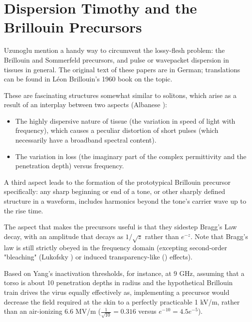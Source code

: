 \documentclass[paper.tex]{subfiles}
\begin{document}
\section{Dispersion Timothy and the Brillouin Precursors}

Uzunoglu \cite{Theoretical2020} mention a handy way to circumvent the lossy-flesh problem: the Brillouin and Sommerfeld precursors\footnotemark, and pulse or wavepacket dispersion in tissues in general. The original text of these papers are in German; translations can be found in Léon Brillouin's 1960 book\cite{Wave1960} on the topic.




These are fascinating structures somewhat similar to solitons, which arise as a result of an interplay between two aspects (Albanese 
\cite{Shortrisetime1989}): 

\begin{itemize}
	\item The highly dispersive nature of tissue (the variation in speed of light with frequency), which causes a peculiar distortion of short pulses (which necessarily have a broadband spectral content).
	\item The variation in loss (the imaginary part of the complex permittivity and the penetration depth) versus frequency. 
\end{itemize}


A third aspect leads to the formation of the prototypical Brillouin precursor specifically: any sharp 
beginning or end of a tone, or other sharply defined structure in a waveform, includes harmonics beyond the tone's carrier wave up to the rise time.

The aspect that makes the precursors useful is that they sidestep Bragg's Law decay, with an amplitude that decays as $1/\sqrt{z}$ rather than $e^{-z}$. Note that Bragg's law is still strictly obeyed in the frequency domain (excepting second-order "bleaching" (Lukofsky \cite{Can}) or induced transparency-like (\cite{Electromagnetically1997}) effects).

Based on Yang's inactivation thresholds, for instance, at 9 GHz, assuming that a torso is about 10 penetration depths in radius and the hypothetical Brillouin train drives the virus equally effectively as, implementing a precursor would decrease the field required at the skin to a perfectly practicable 1 kV/m, rather than an air-ionizing 6.6 MV/m ($\frac{1}{\sqrt{10}}=0.316$ versus $e^{-10}=4.5e^{-5}$). 
\end{document}
